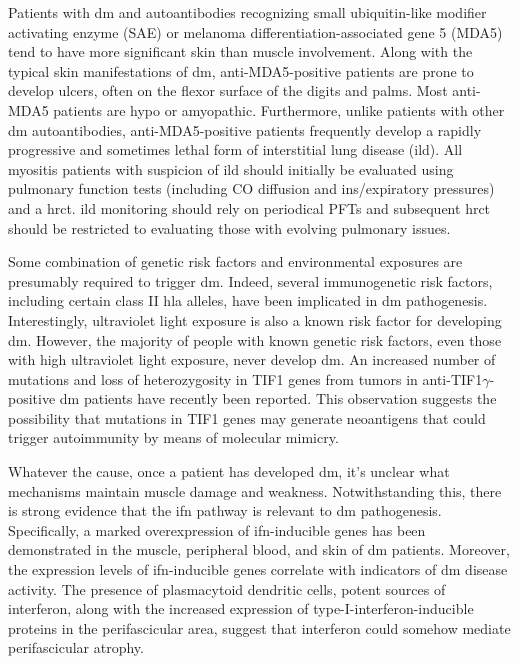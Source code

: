 Patients with \gls{dm} and autoantibodies recognizing small ubiquitin-like modifier activating enzyme (SAE) or melanoma differentiation-associated gene 5 (MDA5) tend to have more significant skin than muscle involvement.\cite{Ge2017,LabradorHorrillo2014,Sato2009,Narang2015} Along with the typical skin manifestations of \gls{dm}, anti-MDA5-positive patients are prone to develop ulcers, often on the flexor surface of the digits and palms.\cite{Narang2015} Most anti-MDA5 patients are hypo or amyopathic.\cite{LabradorHorrillo2014,Sato2009,Narang2015} Furthermore, unlike patients with other \gls{dm} autoantibodies, anti-MDA5-positive patients frequently develop a rapidly progressive and sometimes lethal form of interstitial lung disease (\gls{ild}).\cite{LabradorHorrillo2014,Sato2009} All myositis patients with suspicion of \gls{ild} should initially be evaluated using pulmonary function tests (including CO diffusion and ins/expiratory pressures) and a \gls{hrct}. \gls{ild} monitoring should rely on periodical PFTs and subsequent \gls{hrct} should be restricted to evaluating those with evolving pulmonary issues.

Some combination of genetic risk factors and environmental exposures are presumably required to trigger \gls{dm}. Indeed, several immunogenetic risk factors, including certain class II \gls{hla} alleles, have been implicated in \gls{dm} pathogenesis.\cite{Miller2015} Interestingly, ultraviolet light exposure is also a known risk factor for developing \gls{dm}.\cite{Mamyrova2017} However, the majority of people with known genetic risk factors, even those with high ultraviolet light exposure, never develop \gls{dm}. An increased number of mutations and loss of heterozygosity in TIF1 genes from tumors in anti-TIF1$\gamma$-positive \gls{dm} patients have recently been reported.\cite{PinalFernandez2018} This observation suggests the possibility that mutations in TIF1 genes may generate neoantigens that could trigger autoimmunity by means of molecular mimicry.

Whatever the cause, once a patient has developed \gls{dm}, it’s unclear what mechanisms maintain muscle damage and weakness. Notwithstanding this, there is strong evidence that the \gls{ifn} pathway is relevant to \gls{dm} pathogenesis.\cite{Greenberg2005} Specifically, a marked overexpression of \gls{ifn}-inducible genes has been demonstrated in the muscle,\cite{Greenberg2005} peripheral blood,\cite{Walsh2007,Baechler2007} and skin\cite{Wong2012} of \gls{dm} patients. Moreover, the expression levels of \gls{ifn}-inducible genes correlate with indicators of \gls{dm} disease activity.\cite{Walsh2007,Baechler2007} The presence of plasmacytoid dendritic cells, potent sources of interferon, along with the increased expression of type-I-interferon-inducible proteins in the perifascicular area, suggest that interferon could somehow mediate perifascicular atrophy.\cite{SuarezCalvet2017,Greenberg2005} 

